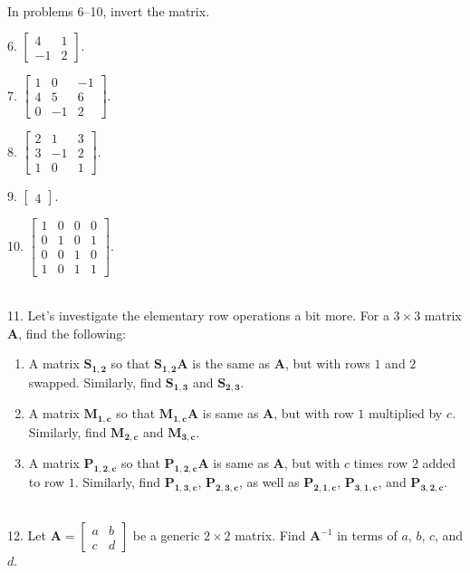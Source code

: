 \documentclass{article}
\begin{document}
~\\

In problems 6--10, invert the matrix.

6. $\displaystyle \left[\begin{array}{cc}4& 1 \\ -1& 2\end{array}\right].$

7. $\displaystyle \left[\begin{array}{ccc}1& 0& -1 \\ 4& 5& 6 \\ 0& -1& 2\end{array}\right].$

8. $\displaystyle \left[\begin{array}{ccc}2& 1& 3 \\ 3& -1& 2 \\ 1& 0& 1\end{array}\right].$

9. $\displaystyle \left[\begin{array}{c}4\end{array}\right].$

10. $\displaystyle \left[\begin{array}{cccc}1& 0& 0& 0 \\ 0& 1& 0& 1 \\ 0& 0& 1& 0 \\ 1& 0& 1& 1\end{array}\right].$

~\\

11. Let's investigate the elementary row operations a bit more. For a $3 \times 3$ matrix $\mathbf{A}$, find the following:

\begin{enumerate}

	\item A matrix $\mathbf{S_{1, 2}}$ so that $\mathbf{S_{1, 2}A}$ is the same as $\mathbf{A}$, but with rows $1$ and $2$ swapped. Similarly, find $\mathbf{S_{1, 3}}$ and $\mathbf{S_{2, 3}}$.

	\item A matrix $\mathbf{M_{1, c}}$ so that $\mathbf{M_{1, c}A}$ is same as $\mathbf{A}$, but with row $1$ multiplied by $c$. Similarly, find $\mathbf{M_{2, c}}$ and $\mathbf{M_{3, c}}$.

	\item A matrix $\mathbf{P_{1, 2, c}}$ so that $\mathbf{P_{1, 2, c}A}$ is same as $\mathbf{A}$, but with $c$ times row $2$ added to row $1$. Similarly, find $\mathbf{P_{1, 3, c}}$, $\mathbf{P_{2, 3, c}}$, as well as $\mathbf{P_{2, 1, c}}$, $\mathbf{P_{3, 1, c}}$, and $\mathbf{P_{3, 2, c}}$.

\end{enumerate}

~\\

12. Let $\displaystyle \mathbf{A} = \left[\begin{array}{cc}a& b \\ c& d\end{array}\right]$ be a generic $2 \times 2$ matrix. Find $\mathbf{A}^{-1}$ in terms of $a$, $b$, $c$, and $d$.
\end{document}

